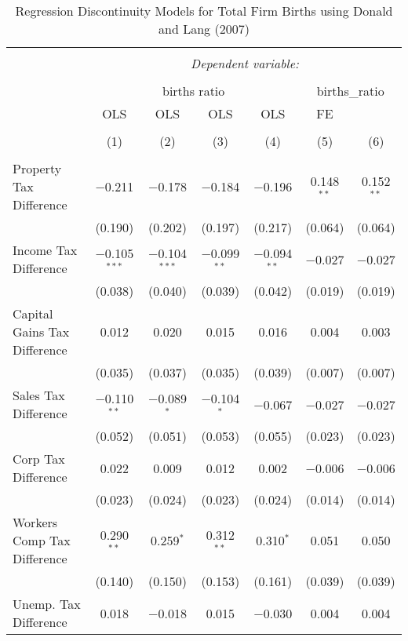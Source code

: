
\begin{table}[!htbp] \centering 
  \caption{Regression Discontinuity Models for  Total Firm Births using Donald and Lang (2007)} 
  \label{} 
\begin{tabular}{@{\extracolsep{5pt}}lcccccc} 
\\[-1.8ex]\hline 
\hline \\[-1.8ex] 
 & \multicolumn{6}{c}{\textit{Dependent variable:}} \\ 
\cline{2-7} 
\\[-1.8ex] & \multicolumn{4}{c}{births ratio} & \multicolumn{2}{c}{births\_ratio} \\ 
 & OLS & OLS & OLS & OLS & FE &  \\ 
\\[-1.8ex] & (1) & (2) & (3) & (4) & (5) & (6)\\ 
\hline \\[-1.8ex] 
 Property Tax Difference & $-$0.211 & $-$0.178 & $-$0.184 & $-$0.196 & 0.148$^{**}$ & 0.152$^{**}$ \\ 
  & (0.190) & (0.202) & (0.197) & (0.217) & (0.064) & (0.064) \\ 
  Income Tax Difference & $-$0.105$^{***}$ & $-$0.104$^{***}$ & $-$0.099$^{**}$ & $-$0.094$^{**}$ & $-$0.027 & $-$0.027 \\ 
  & (0.038) & (0.040) & (0.039) & (0.042) & (0.019) & (0.019) \\ 
  Capital Gains Tax Difference & 0.012 & 0.020 & 0.015 & 0.016 & 0.004 & 0.003 \\ 
  & (0.035) & (0.037) & (0.035) & (0.039) & (0.007) & (0.007) \\ 
  Sales Tax Difference & $-$0.110$^{**}$ & $-$0.089$^{*}$ & $-$0.104$^{*}$ & $-$0.067 & $-$0.027 & $-$0.027 \\ 
  & (0.052) & (0.051) & (0.053) & (0.055) & (0.023) & (0.023) \\ 
  Corp Tax Difference & 0.022 & 0.009 & 0.012 & 0.002 & $-$0.006 & $-$0.006 \\ 
  & (0.023) & (0.024) & (0.023) & (0.024) & (0.014) & (0.014) \\ 
  Workers Comp Tax Difference & 0.290$^{**}$ & 0.259$^{*}$ & 0.312$^{**}$ & 0.310$^{*}$ & 0.051 & 0.050 \\ 
  & (0.140) & (0.150) & (0.153) & (0.161) & (0.039) & (0.039) \\ 
  Unemp. Tax Difference & 0.018 & $-$0.018 & 0.015 & $-$0.030 & 0.004 & 0.004 \\ 

\end{tabular}
\end{table}
